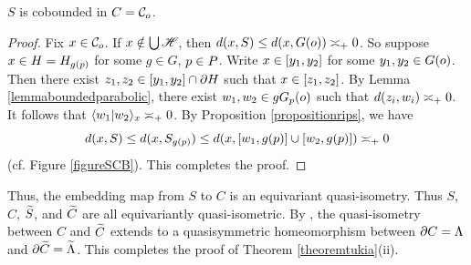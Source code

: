 {\begin{lemma}
\label{lemmaSCB}
$S$ is cobounded in $C = \mathcal C_o$.
\end{lemma}
\begin{proof}
Fix $x\in\mathcal C_o$. If $x\notin \bigcup\mathscr H$, then $d(x,S)\leq d(x,G(o))\asymp_+ 0$. So suppose $x\in H = H_{g(p)}$ for some $g\in G$, $p\in P$. Write $x\in [y_1,y_2]$ for some $y_1,y_2\in G(o)$. Then there exist $z_1,z_2\in [y_1,y_2]\cap \partial H$ such that $x\in [z_1,z_2]$. By Lemma \ref{lemmaboundedparabolic}, there exist $w_1,w_2\in g G_p(o)$ such that $d(z_i,w_i)\asymp_+ 0$. It follows that $\langle w_1|w_2\rangle_x\asymp_+ 0$. By Proposition \ref{propositionrips}, we have
\[
d(x,S) \leq d(x,S_{g(p)}) \leq d(x,[w_1,g(p)]\cup[w_2,g(p)]) \asymp_+ 0
\]
(cf. Figure \ref{figureSCB}). This completes the proof.
\end{proof}





Thus, the embedding map from $S$ to $C$ is an equivariant quasi-isometry. Thus $S$, $C$, $\widetilde S$, and $\widetilde C$ are all equivariantly quasi-isometric. By \cite[Theorem 6.5]{BonkSchramm}, the quasi-isometry between $C$ and $\widetilde C$ extends to a quasisymmetric homeomorphism between $\partial C = \Lambda$ and $\partial\widetilde C = \widetilde\Lambda$. This completes the proof of Theorem \ref{theoremtukia}(ii).


%
%





}
